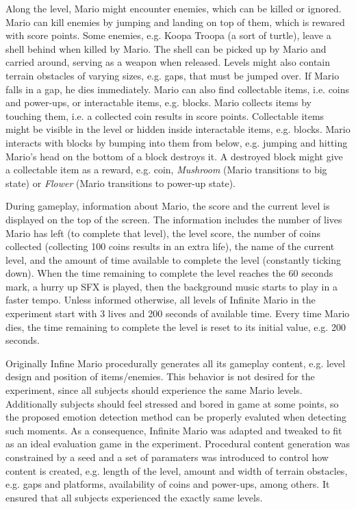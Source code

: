 Along the level, Mario might encounter enemies, which can be killed or ignored. Mario can kill enemies by jumping and landing on top of them, which is rewared with score points. Some enemies, e.g. Koopa Troopa (a sort of turtle), leave a shell behind when killed by Mario. The shell can be picked up by Mario and carried around, serving as a weapon when released. Levels might also contain terrain obstacles of varying sizes, e.g. gaps, that must be jumped over. If Mario falls in a gap, he dies immediately. Mario can also find collectable items, i.e. coins and power-ups, or interactable items, e.g. blocks. Mario collects items by touching them, i.e. a collected coin results in score points. Collectable items might be visible in the level or hidden inside interactable items, e.g. blocks. Mario interacts with blocks by bumping into them from below, e.g. jumping and hitting Mario's head on the bottom of a block destroys it. A destroyed block might give a collectable item as a reward, e.g. coin, \textit{Mushroom} (Mario transitions to big state) or \textit{Flower} (Mario transitions to power-up state).

During gameplay, information about Mario, the score and the current level is displayed on the top of the screen. The information includes the number of lives Mario has left (to complete that level), the level score, the number of coins collected (collecting 100 coins results in an extra life), the name of the current level, and the amount of time available to complete the level (constantly ticking down). When the time remaining to complete the level reaches the 60 seconds mark, a hurry up SFX is played, then the background music starts to play in a faster tempo. Unless informed otherwise, all levels of Infinite Mario in the experiment start with 3 lives and 200 seconds of available time. Every time Mario dies, the time remaining to complete the level is reset to its initial value, e.g. 200 seconds.

Originally Infine Mario procedurally generates all its gameplay content, e.g. level design and position of items/enemies. This behavior is not desired for the experiment, since all subjects should experience the same Mario levels. Additionally subjects should feel stressed and bored in game at some points, so the proposed emotion detection method can be properly evaluted when detecting such moments. As a consequence, Infinite Mario was adapted and tweaked to fit as an ideal evaluation game in the experiment. Procedural content generation was constrained by a seed and a set of paramaters was introduced to control how content is created, e.g. length of the level, amount and width of terrain obstacles, e.g. gaps and platforms, availability of coins and power-ups, among others. It ensured that all subjects experienced the exactly same levels.


